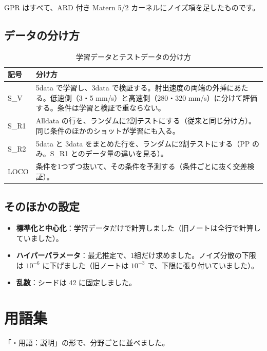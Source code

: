 \documentclass[paper=a4paper,fontsize=10.5pt,line_length=44zw,number_of_lines=38]{jlreq}
\newenvironment{points}{\begin{itemize}[label=$\triangleright$,leftmargin=1.5\zw,itemsep=0.3ex,topsep=0.5ex,parsep=0pt]}{\end{itemize}}
\newcommand{\pt}[1]{\item \textbf{#1}：}
\begin{document}
GPR はすべて、ARD 付き Matern 5/2 カーネルにノイズ項を足したものです。

\subsection{データの分け方}
\begin{table}[H]
\caption{学習データとテストデータの分け方}
\begin{tabularx}{\linewidth}{@{}lX@{}}
\toprule
記号 & 分け方 \\
\midrule
S\_V & 5data で学習し、3data で検証する。射出速度の両端の外挿にあたる。低速側（3・5 mm/s）と高速側（280・320 mm/s）に分けて評価する。条件は学習と検証で重ならない。 \\
S\_R1 & Alldata の行を、ランダムに2割テストにする（従来と同じ分け方）。同じ条件のほかのショットが学習にも入る。 \\
S\_R2 & 5data と 3data をまとめた行を、ランダムに2割テストにする（PP のみ。S\_R1 とのデータ量の違いを見る）。 \\
LOCO & 条件を1つずつ抜いて、その条件を予測する（条件ごとに抜く交差検証）。 \\
\bottomrule
\end{tabularx}
\end{table}

\subsection{そのほかの設定}
\begin{points}
\pt{標準化と中心化}学習データだけで計算しました（旧ノートは全行で計算していました）。
\pt{ハイパーパラメータ}最尤推定で、1組だけ求めました。ノイズ分散の下限は $10^{-6}$ に下げました（旧ノートは $10^{-3}$ で、下限に張り付いていました）。
\pt{乱数}シードは 42 に固定しました。
\end{points}

\section{用語集}

「・用語：説明」の形で、分野ごとに並べました。
\end{document}
